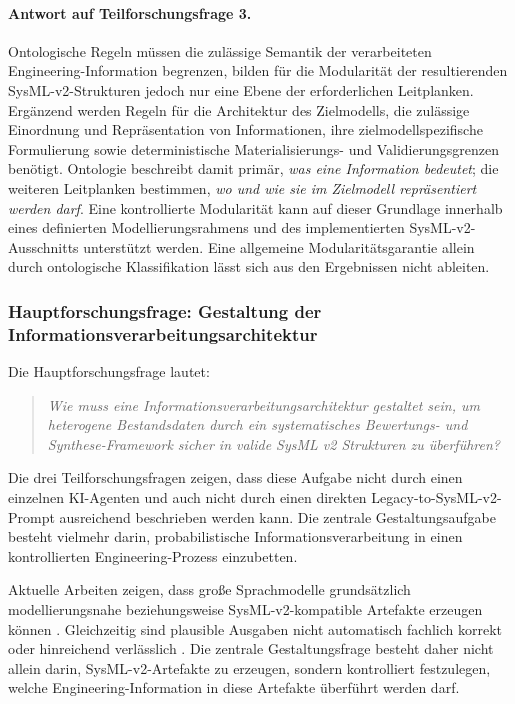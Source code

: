 \paragraph{Antwort auf Teilforschungsfrage 3.}

Ontologische Regeln müssen die zulässige Semantik der verarbeiteten
Engineering-Information begrenzen, bilden für die Modularität der
resultierenden SysML-v2-Strukturen jedoch nur eine Ebene der erforderlichen
Leitplanken. Ergänzend werden Regeln für die Architektur des Zielmodells, die
zulässige Einordnung und Repräsentation von Informationen, ihre
zielmodellspezifische Formulierung sowie deterministische Materialisierungs-
und Validierungsgrenzen benötigt. Ontologie beschreibt damit primär,
\emph{was eine Information bedeutet}; die weiteren Leitplanken bestimmen,
\emph{wo und wie sie im Zielmodell repräsentiert werden darf}. Eine
kontrollierte Modularität kann auf dieser Grundlage innerhalb eines
definierten Modellierungsrahmens und des implementierten
SysML-v2-Ausschnitts unterstützt werden. Eine allgemeine
Modularitätsgarantie allein durch ontologische Klassifikation lässt sich aus
den Ergebnissen nicht ableiten.


\subsubsection{Hauptforschungsfrage: Gestaltung der Informationsverarbeitungsarchitektur}
\label{sec:discussion_main_rq}

Die Hauptforschungsfrage lautet:

\begin{quote}
\textit{Wie muss eine Informationsverarbeitungsarchitektur gestaltet sein, um
heterogene Bestandsdaten durch ein systematisches Bewertungs- und
Synthese-Framework sicher in valide SysML v2 Strukturen zu überführen?}
\end{quote}

Die drei Teilforschungsfragen zeigen, dass diese Aufgabe nicht durch einen
einzelnen KI-Agenten und auch nicht durch einen direkten
Legacy-to-SysML-v2-Prompt ausreichend beschrieben werden kann. Die zentrale
Gestaltungsaufgabe besteht vielmehr darin, probabilistische
Informationsverarbeitung in einen kontrollierten Engineering-Prozess
einzubetten.

Aktuelle Arbeiten zeigen, dass große Sprachmodelle grundsätzlich
modellierungsnahe beziehungsweise SysML-v2-kompatible Artefakte erzeugen
können \cite{Stein2026,Pan.2025,Cibrian.2025}. Gleichzeitig sind plausible
Ausgaben nicht automatisch fachlich korrekt oder hinreichend verlässlich
\cite{Topcu2025,Barke2023,Sergeyuk2025}. Die zentrale Gestaltungsfrage
besteht daher nicht allein darin, SysML-v2-Artefakte zu erzeugen, sondern
kontrolliert festzulegen, welche Engineering-Information in diese Artefakte
überführt werden darf.

